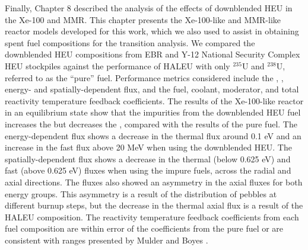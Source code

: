 Finally, Chapter 8 described the analysis of the effects of 
downblended \gls{HEU} in the Xe-100 and \gls{MMR}. This 
chapter presents the  Xe-100-like and 
\gls{MMR}-like reactor models developed for this work,
which we also used to assist in obtaining spent fuel 
compositions for the transition analysis. 
We compared the downblended \gls{HEU} compositions from \gls{EBR} 
and Y-12 National Security Complex \gls{HEU} stockpiles  
against the performance of \gls{HALEU} with only 
$^{235}$U and $^{238}$U, referred to as the ``pure'' fuel. 
Performance metrics considered include the 
\keff, \betaEff, energy- and spatially-dependent flux, and 
the fuel, coolant, moderator, and total reactivity temperature 
feedback coefficients. The results of the Xe-100-like 
reactor in an equilibrium state show that the impurities from 
the downblended 
\gls{HEU} fuel increases the \keff but decreases the \betaEff, 
compared with the results of the pure fuel. 
The energy-dependent flux shows a decrease in the thermal flux 
around 0.1 eV and an increase in the fast flux above 20 MeV 
when using the downblended \gls{HEU}. The spatially-dependent 
flux shows a decrease in the thermal (below 0.625 eV) and 
fast (above 0.625 eV) fluxes when using the impure fuels, 
across the radial and axial directions. 
The fluxes also showed an asymmetry 
in the axial fluxes for both energy groups. This asymmetry 
is a result of the distribution of pebbles at different 
burnup steps, but the decrease in the thermal axial 
flux is a result of the \gls{HALEU} composition.
 The reactivity temperature 
feedback coefficients from each fuel composition are within 
error of the coefficients from the pure fuel or are 
consistent with ranges presented by Mulder and Boyes 
\cite{mulder_neutronics_2020}.

